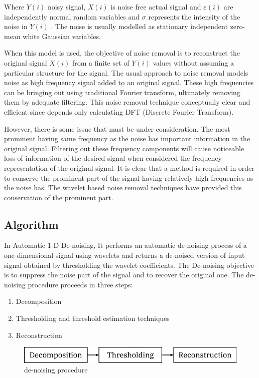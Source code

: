 \documentclass[12pt, a4paper, twoside]{report}
\begin{document}
Where $Y(i)$ noisy signal,  $X(i)$  is noise free actual signal and  $\varepsilon(i)$ are independently normal random variables and  $\sigma$ represents the intensity of the noise in $Y(i)$  . The noise is usually modelled as stationary independent zero-mean white Gaussian variables.
\par
When this model is used, the objective of noise removal is to reconstruct the original signal $X(i)$  from a finite set of $Y(i)$  values without assuming a particular structure for the signal. The usual approach to noise removal models noise as high frequency signal added to an original signal. These high frequencies can be bringing out using traditional Fourier transform, ultimately removing them by adequate filtering. This noise removal technique conceptually clear and efficient since depends only calculating DFT (Discrete Fourier Transform).
\par
However, there is some issue that must be under consideration. The most prominent having same frequency as the noise has important information in the original signal. Filtering out these frequency components will cause noticeable loss of information of the desired signal when considered the frequency representation of the original signal. It is clear that a method is required in order to conserve the prominent part of the signal having relatively high frequencies as the noise has. The wavelet based noise removal techniques have provided this conservation of the prominent part.

\subsection{Algorithm}
In Automatic 1-D De-noising, It performs an automatic 
de-noising process of a one-dimensional  signal  using wavelets  and  returns  a  de-noised  version of  input  signal  obtained  by  thresholding the  wavelet  coefficients.  The  De-noising objective  is  to  suppress  the  noise  part  of the  signal  and  to  recover  the  original one. The de-noising procedure proceeds in three steps:
\begin{enumerate}[label=\Roman*., noitemsep]
\item Decomposition
\item Thresholding and threshold estimation techniques 
\item Reconstruction
\end{enumerate}
\begin{figure}[!h]
	\centering
	\includegraphics[]
	{images/chapter3/denoise-proc}
	\caption{de-noising procedure}
	\label{fig:denoise-proc}
\end{figure}
\end{document}
